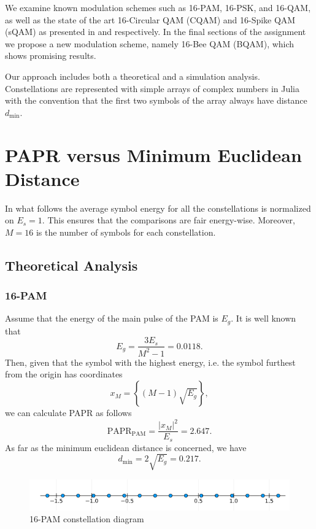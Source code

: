 \documentclass[11pt,a4paper,onecolumn,final]{article}
\begin{document}
We examine known modulation schemes such as 16-PAM, 16-PSK, and 16-QAM, as well as the state of the art 16-Circular QAM (CQAM) and 16-Spike QAM (sQAM) as presented in \cite{cqam} and \cite{sqam} respectively. In the final sections of the assignment we propose a new modulation scheme, namely 16-Bee QAM (BQAM), which shows promising results. 

Our approach includes both a theoretical and a simulation analysis. Constellations are represented with simple arrays of complex numbers in Julia with the convention that the first two symbols of the array always have distance \(d_\text{min}\). 

\section{PAPR versus Minimum Euclidean Distance}
In what follows the average symbol energy for all the constellations is normalized on \(E_s = 1\). This ensures that the comparisons are fair energy-wise. Moreover, \(M = 16\) is the number of symbols for each constellation. 

\subsection{Theoretical Analysis}
\subsubsection*{16-PAM} 
Assume that the energy of the main pulse of the PAM is \(E_g\). It is well known that 
\begin{equation}
    E_g = \frac{3E_s }{M^2 - 1} = 0.0118. 
\end{equation}
Then, given that the symbol with the highest energy, i.e. the symbol furthest from the origin has coordinates 
\begin{equation}
    x_M = \left\{(M-1)\sqrt{E_g}\right\}, 
\end{equation}
we can calculate PAPR as follows 
\begin{equation}
    \text{PAPR}_\text{PAM} = \frac{|x_M|^2}{E_s} = 2.647.
\end{equation}
As far as the minimum euclidean distance is concerned, we have
\begin{equation}
    d_\text{min} = 2\sqrt{E_g} = 0.217.
\end{equation}

\begin{figure}[h]
    \centering
    \includegraphics[scale=0.7]{16pam.png}
    \caption{16-PAM constellation diagram}
\end{figure}
\end{document}
